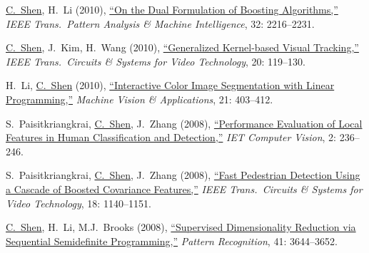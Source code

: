 \documentclass[9pt, a4paper]{article}
\newcommand{\years}[1]{\marginnote{\scriptsize #1}}
\def\highlight{\uline}
\begin{document}
\medskip

\years{2010} \highlight{C.~Shen}, H.~Li (2010),
\href{http://www.google.com/search?lr=&ie=UTF-8&oe=UTF-8&q=On+the+Dual+Formulation+of+Boosting+Algorithms+Chunhua+Shen%2C+Hanxi+Li}{``On the Dual Formulation of Boosting Algorithms,{}''}
\emph{IEEE Trans.\  Pattern Analysis \& Machine Intelligence}, 32: 2216--2231.

\medskip

\years{2010} \highlight{C.~Shen}, J.~Kim, H.~Wang (2010),
\href{http://www.google.com/search?lr=&ie=UTF-8&oe=UTF-8&q=Generalized+Kernel-based+Visual+Tracking+Chunhua+Shen%2C+Junae+Kim%2C+Hanzi+Wang}{``Generalized Kernel-based Visual Tracking,{}''}
\emph{IEEE Trans.\  Circuits \& Systems for Video Technology}, 20: 119--130.

\medskip

\years{2010} H.~Li, \highlight{C.~Shen} (2010),
\href{http://www.google.com/search?lr=&ie=UTF-8&oe=UTF-8&q=Interactive+Color+Image+Segmentation+with+Linear+Programming+Hongdong+Li%2C+Chunhua+Shen}{``Interactive Color Image Segmentation with Linear Programming,{}''}
\emph{Machine Vision \& Applications}, 21: 403--412.

\medskip

\years{2008} S.~Paisitkriangkrai, \highlight{C.~Shen}, J.~Zhang (2008),
\href{http://www.google.com/search?lr=&ie=UTF-8&oe=UTF-8&q=Performance+Evaluation+of+Local+Features+in+Human+Classification+and+Detection+Sakrapee+Paisitkriangkrai%2C+Chunhua+Shen%2C+Jian+Zhang}{``Performance Evaluation of Local Features in Human Classification and Detection,{}''}
\emph{IET Computer Vision}, 2: 236--246.

\medskip

\years{2008} S.~Paisitkriangkrai, \highlight{C.~Shen}, J.~Zhang (2008),
\href{http://www.google.com/search?lr=&ie=UTF-8&oe=UTF-8&q=Fast+Pedestrian+Detection+Using+a+Cascade+of+Boosted+Covariance+Features+Sakrapee+Paisitkriangkrai%2C+Chunhua+Shen%2C+Jian+Zhang}{``Fast Pedestrian Detection Using a Cascade of Boosted Covariance Features,{}''}
\emph{IEEE Trans.\  Circuits \& Systems for Video Technology}, 18: 1140--1151.

\medskip

\years{2008} \highlight{C.~Shen}, H.~Li, M.J.~Brooks (2008),
\href{http://www.google.com/search?lr=&ie=UTF-8&oe=UTF-8&q=Supervised+Dimensionality+Reduction+via+Sequential+Semidefinite+Programming+Chunhua+Shen%2C+Hongdong+Li%2C+Michael+J.+Brooks}{``Supervised Dimensionality Reduction via Sequential Semidefinite Programming,{}''}
\emph{Pattern Recognition}, 41: 3644--3652.
\end{document}
